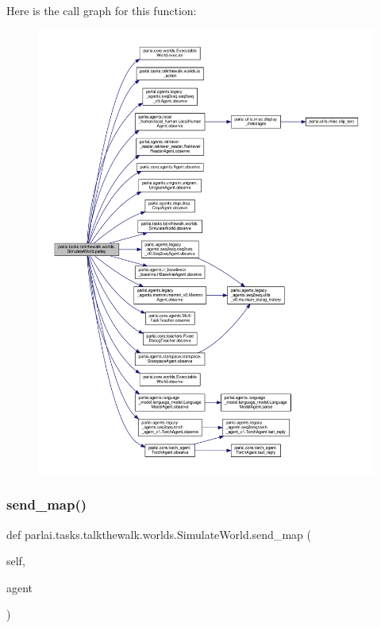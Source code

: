 Here is the call graph for this function\+:
\nopagebreak
\begin{figure}[H]
\begin{center}
\leavevmode
\includegraphics[width=350pt]{classparlai_1_1tasks_1_1talkthewalk_1_1worlds_1_1SimulateWorld_a6bd5a8a8e194dd4aa76aeecdf429bc7f_cgraph}
\end{center}
\end{figure}
\mbox{\label{classparlai_1_1tasks_1_1talkthewalk_1_1worlds_1_1SimulateWorld_aaf801dc51b7f37b6fb9629194ca4b2ee}} 
\subsubsection{\texorpdfstring{send\+\_\+map()}{send\_map()}}
{\footnotesize\ttfamily def parlai.\+tasks.\+talkthewalk.\+worlds.\+Simulate\+World.\+send\+\_\+map (\begin{DoxyParamCaption}\item[{}]{self,  }\item[{}]{agent }\end{DoxyParamCaption})}



